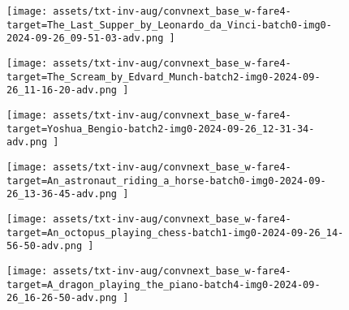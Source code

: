 \begin{figure*}[t]
    \vspace{1mm}
    \begin{minipage}[t]{.025\textwidth}
         \vspace{9mm}
    \end{minipage}%
    \begin{minipage}[t]{.98\textwidth}
        \vspace{0pt}
            \begin{subfigure}[t]{0.16\textwidth}
                    \texttt{[image:  assets/txt-inv-aug/convnext\_base\_w-fare4-target=The\_Last\_Supper\_by\_Leonardo\_da\_Vinci-batch0-img0-2024-09-26\_09-51-03-adv.png ]}
            \end{subfigure}%
                \hspace{0.5mm}%
            \begin{subfigure}[t]{0.16\textwidth}
                    \texttt{[image:  assets/txt-inv-aug/convnext\_base\_w-fare4-target=The\_Scream\_by\_Edvard\_Munch-batch2-img0-2024-09-26\_11-16-20-adv.png ]}
            \end{subfigure}%
                \hspace{0.5mm}%
            \begin{subfigure}[t]{0.16\textwidth}
                    \texttt{[image:  assets/txt-inv-aug/convnext\_base\_w-fare4-target=Yoshua\_Bengio-batch2-img0-2024-09-26\_12-31-34-adv.png ]}
            \end{subfigure}%
                \hspace{0.5mm}%
            \begin{subfigure}[t]{0.16\textwidth}
                    \texttt{[image:  assets/txt-inv-aug/convnext\_base\_w-fare4-target=An\_astronaut\_riding\_a\_horse-batch0-img0-2024-09-26\_13-36-45-adv.png ]}
            \end{subfigure}%
                \hspace{0.5mm}%
            \begin{subfigure}[t]{0.16\textwidth}
                    \texttt{[image:  assets/txt-inv-aug/convnext\_base\_w-fare4-target=An\_octopus\_playing\_chess-batch1-img0-2024-09-26\_14-56-50-adv.png ]}
            \end{subfigure}%
                \hspace{0.5mm}%
            \begin{subfigure}[t]{0.16\textwidth}
                    \texttt{[image:  assets/txt-inv-aug/convnext\_base\_w-fare4-target=A\_dragon\_playing\_the\_piano-batch4-img0-2024-09-26\_16-26-50-adv.png ]}
            \end{subfigure}%
    \end{minipage}


\end{figure*}
